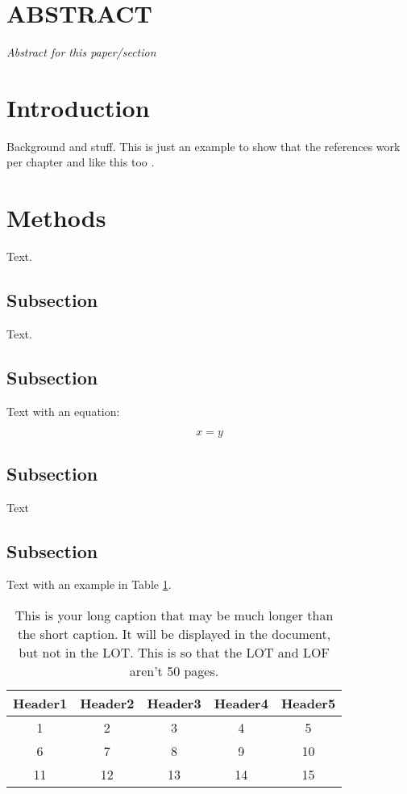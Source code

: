 \newpage
\normalsize
\doublespacing
\renewcommand{\thechapter}{\arabic{chapter}}
\section*{ABSTRACT} 
\textit{Abstract for this paper/section}

\section{Introduction}
Background and stuff. This is just an example to show that the references work per chapter \cite{book2} and like this too \cite{article2}.

\section{Methods}

Text.

\subsection{Subsection}

Text.

\subsection{Subsection}

Text with an equation:

\begin{equation}
x = y
\end{equation}

\subsection{Subsection}

Text

\subsection{Subsection}

Text with an example in Table \ref{tab:best_table_ever}.

\begin{table}[!ht]
\centering
\caption[This is your short caption for LOT]{This is your long caption that may be much longer than the short caption. It will be displayed in the document, but not in the LOT. This is so that the LOT and LOF aren't 50 pages.}
\label{tab:best_table_ever}
\begin{tabular}{|c|c|c|c|c|}
\hline
Header1 & Header2 & Header3 & Header4  & Header5 \\ \hline
1 & 2 & 3 & 4 & 5 \\ \hline
6 & 7 & 8 & 9 & 10 \\ \hline
11 & 12  & 13  & 14  & 15 \\ \hline
\end{tabular}
\end{table}

